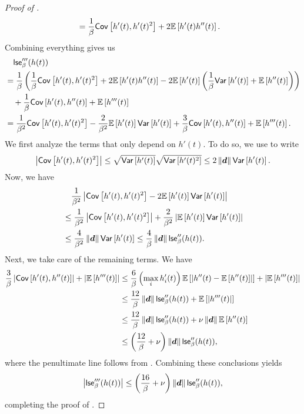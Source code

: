 \begin{proof}[Proof of ]
\begin{align*}
    &= \frac{1}{\beta}\cov{h'(t), h'(t)^2} + 2\exv{h'(t)h''(t)}.
\end{align*}
Combining everything gives us
\begin{align*}
    &\quad \lse_{\beta}'''(h(t)) \\
    &= \frac{1}{\beta}\inparen{\frac{1}{\beta}\cov{h'(t), h'(t)^2} + 2\exv{h'(t)h''(t)} - 2\exv{h'(t)}\inparen{\frac{1}{\beta}\var{h'(t)} + \exv{h''(t)}}}\\
    &\quad + \frac{1}{\beta}\cov{h'(t),h''(t)} + \exv{h'''(t)} \\
    &= \frac{1}{\beta^2}\cov{h'(t),h'(t)^2} - \frac{2}{\beta^2}\exv{h'(t)}\var{h'(t)} + \frac{3}{\beta}\cov{h'(t),h''(t)} + \exv{h'''(t)}.
\end{align*}
We first analyze the terms that only depend on $h'(t)$. To do so, we use  to write
\begin{align*}
    \abs{\cov{h'(t),h'(t)^2}} \le \sqrt{\var{h'(t)}}\sqrt{\var{h'(t)^2}} \le 2\norm{\vd}\var{h'(t)}.
\end{align*}
Now, we have
\begin{align*}
    &\quad \frac{1}{\beta^2}\abs{\cov{h'(t),h'(t)^2} - 2\exv{h'(t)}\var{h'(t)}} \\
    &\le \frac{1}{\beta^2}\abs{\cov{h'(t),h'(t)^2}} + \frac{2}{\beta^2}\abs{\exv{h'(t)}\var{h'(t)}} \\
    &\le \frac{4}{\beta^2}\norm{\vd}\var{h'(t)} \le \frac{4}{\beta}\norm{\vd}\lse_{\beta}''(h(t)).
\end{align*}
Next, we take care of the remaining terms. We have
\begin{align*}
    \frac{3}{\beta}\abs{\cov{h'(t),h''(t)}} + \abs{\exv{h'''(t)}} &\le \frac{6}{\beta}\inparen{\max_{i} h_i'(t)}\exv{\abs{h''(t)-\exv{h''(t)}}} + \abs{\exv{h'''(t)}} \\
    &\le \frac{12}{\beta}\norm{\vd}\lse_{\beta}''(h(t)) + \exv{\abs{h'''(t)}} \\
    &\le \frac{12}{\beta}\norm{\vd}\lse_{\beta}''(h(t)) + \nu\norm{\vd}\exv{h''(t)} \\
    &\le \inparen{\frac{12}{\beta}+\nu}\norm{\vd}\lse_{\beta}''(h(t)),
\end{align*}
where the penultimate line follows from . Combining these conclusions yields
\begin{align*}
    \abs{\lse_{\beta}'''(h(t))} \le \inparen{\frac{16}{\beta}+\nu}\norm{\vd}\lse_{\beta}''(h(t)),
\end{align*}
completing the proof of .
\end{proof}

